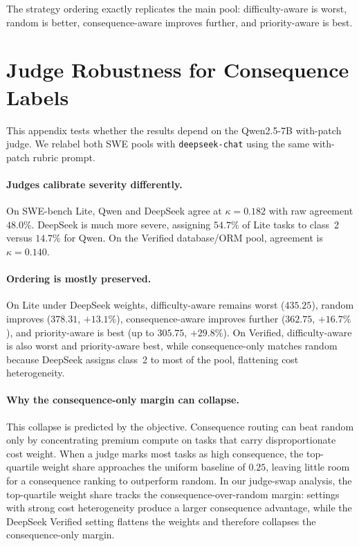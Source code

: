 \documentclass{article}
\begin{document}
The strategy ordering exactly replicates the main pool:
difficulty-aware is worst, random is better, consequence-aware improves
further, and priority-aware is best.

\section{Judge Robustness for Consequence Labels}
\label{app:judge2}

This appendix tests whether the results depend on the Qwen2.5-7B
with-patch judge. We relabel both SWE pools with
\texttt{deepseek-chat} using the same with-patch rubric prompt.

\paragraph{Judges calibrate severity differently.}
On SWE-bench Lite, Qwen and DeepSeek agree at $\kappa=0.182$ with raw
agreement $48.0\%$. DeepSeek is much more severe, assigning $54.7\%$
of Lite tasks to class~2 versus $14.7\%$ for Qwen. On the Verified
database/ORM pool, agreement is $\kappa=0.140$.

\paragraph{Ordering is mostly preserved.}
On Lite under DeepSeek weights, difficulty-aware remains worst
($435.25$), random improves ($378.31$, $+13.1\%$), consequence-aware
improves further ($362.75$, $+16.7\%$), and priority-aware is best
(up to $305.75$, $+29.8\%$). On Verified, difficulty-aware is also
worst and priority-aware best, while consequence-only matches random
because DeepSeek assigns class~2 to most of the pool, flattening cost
heterogeneity.

\paragraph{Why the consequence-only margin can collapse.}
This collapse is predicted by the objective. Consequence routing can
beat random only by concentrating premium compute on tasks that carry
disproportionate cost weight. When a judge marks most tasks as high
consequence, the top-quartile weight share approaches the uniform
baseline of $0.25$, leaving little room for a consequence ranking to
outperform random. In our judge-swap analysis, the top-quartile weight
share tracks the consequence-over-random margin: settings with strong
cost heterogeneity produce a larger consequence advantage, while the
DeepSeek Verified setting flattens the weights and therefore collapses
the consequence-only margin.
\end{document}
